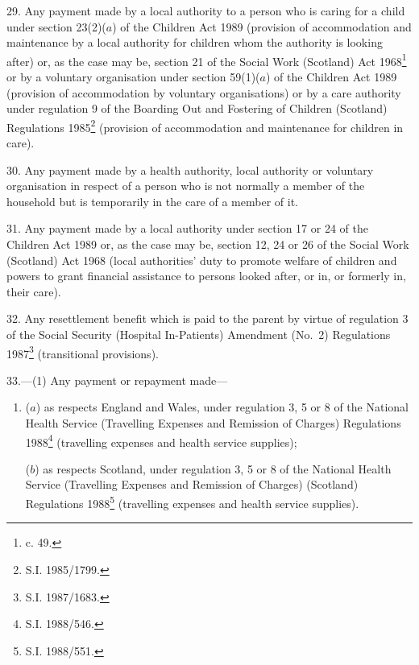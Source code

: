 \documentclass[a4paper]{article}
\begin{document}
29.  Any payment made by a local authority to a person who is caring for a child under section 23(2)($a$) of the Children Act 1989 (provision of accommodation and maintenance by a local authority for children whom the authority is looking after) or, as the case may be, section 21 of the Social Work (Scotland) Act 1968\footnote{ c. 49.} or by a voluntary organisation under section 59(1)($a$) of the Children Act 1989 (provision of accommodation by voluntary organisations) or by a care authority under regulation 9 of the Boarding Out and Fostering of Children (Scotland) Regulations 1985\footnote{\frenchspacing S.I. 1985/1799.} (provision of accommodation and maintenance for children in care).

\medskip

30.  Any payment made by a health authority, local authority or voluntary organisation in respect of a person who is not normally a member of the household but is temporarily in the care of a member of it.

\medskip

31.  Any payment made by a local authority under section 17 or 24 of the Children Act 1989 or, as the case may be, section 12, 24 or 26 of the Social Work (Scotland) Act 1968 (local authorities' duty to promote welfare of children and powers to grant financial assistance to persons looked after, or in, or formerly in, their care).

\medskip

32.  Any resettlement benefit which is paid to the parent by virtue of regulation 3 of the Social Security (Hospital In-Patients) Amendment (No.\ 2) Regulations 1987\footnote{\frenchspacing S.I. 1987/1683.} (transitional provisions).

\medskip

33.—(1) Any payment or repayment made—
\begin{enumerate}\item[]
($a$) as respects England and Wales, under regulation 3, 5 or 8 of the National Health Service (Travelling Expenses and Remission of Charges) Regulations 1988\footnote{\frenchspacing S.I. 1988/546.} (travelling expenses and health service supplies);

($b$) as respects Scotland, under regulation 3, 5 or 8 of the National Health Service (Travelling Expenses and Remission of Charges) (Scotland) Regulations 1988\footnote{\frenchspacing S.I. 1988/551.} (travelling expenses and health service supplies).
\end{enumerate}
\end{document}
